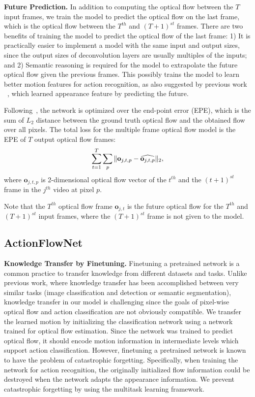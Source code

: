 \documentclass[10pt,twocolumn,letterpaper]{article}
\begin{document}
\textbf{Future Prediction.}
In addition to computing the optical flow between the $T$ input frames, we train the model to predict the optical flow on the last frame, which is the optical flow between the $T^{th}$ and $(T+1)^{st}$ frames.
There are two benefits of training the model to predict the optical flow of the last frame:
1) It is practically easier to implement a model with the same input and output sizes, since the output sizes of deconvolution layers are usually multiples of the inputs; and
2) Semantic reasoning is required for the model to extrapolate the future optical flow given the previous frames. This possibly trains the model to learn better motion features for action recognition, as also suggested by previous work ~\cite{walker2016uncertain}, which learned appearance feature by predicting the future.

Following~\cite{FischerDIHHGSCB15}, the network is optimized over the end-point error (EPE), which is the sum of $L_2$ distance between the ground truth optical flow and the obtained flow over all pixels.
The total loss for the multiple frame optical flow model is the EPE of $T$ output optical flow frames:
\vspace{-.5em}\begin{equation}
  \sum_{t=1}^T\sum_{p} \|\mathbf{o}_{j,t,p} - \widehat{\mathbf{o}_{j,t,p}} \|_2,
	\label{eq:loss_epe}
  \vspace{-.5em}
\end{equation}
where $\mathbf{o}_{j,t,p}$ is 2-dimensional optical flow vector of the $t^{th}$ and the $(t+1)^{st}$ frame in the $j^{th}$ video at pixel $p$.

Note that the $T^{th}$ optical flow frame $\mathbf{o}_{j,t}$ is the future optical flow for the $T^{th}$ and $(T+1)^{st}$ input frames, where the $(T+1)^{st}$ frame is not given to the model.

\subsection{ActionFlowNet}\label{sec:multi}\noindent\textbf{Knowledge Transfer by Finetuning.}
Finetuning a pretrained network is a common practice to transfer knowledge from different datasets and tasks.
Unlike previous work, where knowledge transfer has been accomplished between very similar tasks (image classification and detection or semantic segmentation), knowledge transfer in our model is challenging since the goals of pixel-wise optical flow and action classification are not obviously compatible. 
We transfer the learned motion by initializing the classification network using a network trained for optical flow estimation.
Since the network was trained to predict optical flow, it should encode motion information in intermediate levels which support action classification.
However, finetuning a pretrained network is known to have the problem of catastrophic forgetting.
Specifically, when training the network for action recognition, the originally initialized flow information could be destroyed when the network adapts the appearance information.
We prevent catastrophic forgetting by using the multitask learning framework.
\end{document}
